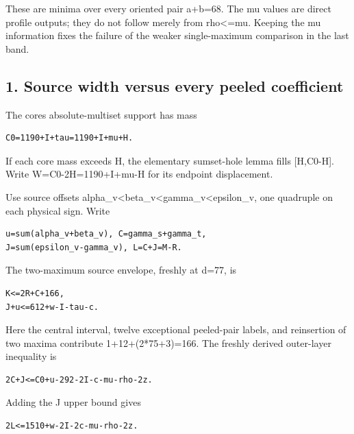 \documentclass[10pt,a4paper]{article}
\theoremstyle{definition}
\begin{document}
These are minima over every oriented pair a+\allowbreak{}b=\allowbreak{}68. The mu values are
direct profile outputs; they do not follow merely from rho\textless=\allowbreak{}mu.
Keeping the mu information fixes the failure of the weaker
single-maximum comparison in the last band.

\hypertarget{source-width-versus-every-peeled-coefficient}{%
\subsection{1. Source width versus every peeled
coefficient}\label{source-width-versus-every-peeled-coefficient}}

The core\textquotesingle s absolute-multiset support has mass

\begin{lstlisting}
C0=1190+I+tau=1190+I+mu+H.
\end{lstlisting}

If each core mass exceeds H,\allowbreak{} the elementary sumset-hole lemma fills
{[}H,\allowbreak{}C0-H{]}. Write W=\allowbreak{}C0-2H=\allowbreak{}1190+\allowbreak{}I+\allowbreak{}mu-H for its endpoint displacement.

Use source offsets
alpha\_\allowbreak{}v\textless beta\_\allowbreak{}v\textless gamma\_\allowbreak{}v\textless epsilon\_\allowbreak{}v,\allowbreak{} one
quadruple on each physical sign. Write

\begin{lstlisting}
u=sum(alpha_v+beta_v), C=gamma_s+gamma_t,
J=sum(epsilon_v-gamma_v), L=C+J=M-R.
\end{lstlisting}

The two-maximum source envelope,\allowbreak{} freshly at d=\allowbreak{}77,\allowbreak{} is

\begin{lstlisting}
K<=2R+C+166,
J+u<=612+w-I-tau-c.
\end{lstlisting}

Here the central interval,\allowbreak{} twelve exceptional peeled-pair labels,\allowbreak{} and
reinsertion of two maxima contribute 1+\allowbreak{}12+\allowbreak{}(2*75+\allowbreak{}3)=\allowbreak{}166. The freshly
derived outer-layer inequality is

\begin{lstlisting}
2C+J<=C0+u-292-2I-c-mu-rho-2z.
\end{lstlisting}

Adding the J upper bound gives

\begin{lstlisting}
2L<=1510+w-2I-2c-mu-rho-2z.
\end{lstlisting}
\end{document}
